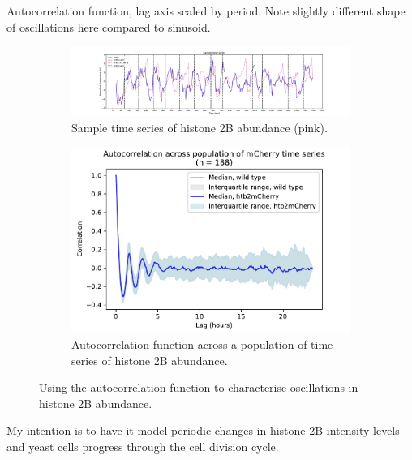 Autocorrelation function, lag axis scaled by period.
Note slightly different shape of oscillations here compared to sinusoid.

\begin{figure}
  \centering
  \begin{subfigure}[t]{0.9\textwidth}
  \centering
    \includegraphics[width=\linewidth]{htb2mCherry_26643_plots_purple_01.pdf}
    \caption{
      Sample time series of histone 2B abundance (pink).
    }
    \label{fig:acf-fhn-biol-ts}
  \end{subfigure}

  \begin{subfigure}[t]{0.7\textwidth}
  \centering
    \includegraphics[width=\linewidth]{htb2mCherry_26643_plots_mCh_06.png}
    \caption{
      Autocorrelation function across a population of time series of histone 2B abundance.
    }
    \label{fig:acf-fhn-biol-acf}
  \end{subfigure}

  \caption{
    Using the autocorrelation function to characterise oscillations in histone 2B abundance.
  }
  \label{fig:acf-fhn-biol}
\end{figure}

My intention is to have it model periodic changes in histone 2B intensity levels and yeast cells progress through the cell division cycle.

